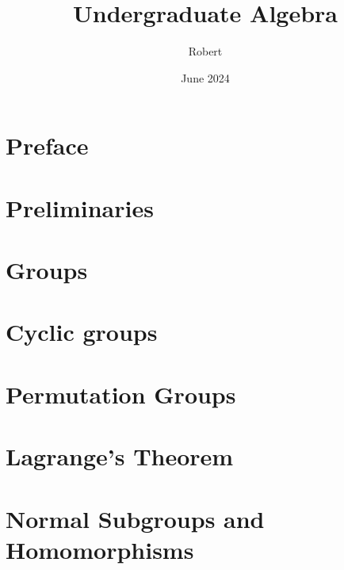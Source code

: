 \documentclass[oneside]{book}
\title{Undergraduate Algebra}
\author{Robert}
\date{June 2024}
\makeatletter
\edef\myauthor{\@author}
\edef\mytitle{\@title}
\makeatother
\begin{document}
\pagestyle{fancy}

\frontmatter
{}

\tableofcontents

\listoftheorems[ignoreall, show={theorem}]
\chapter*{Preface}


\mainmatter
\setcounter{chapter}{-1}
\chapter{Preliminaries}



\chapter{Groups}
\label{chapter:groups}


\chapter{Cyclic groups}
\label{chapter:cyclic-groups}


\chapter{Permutation Groups}
\label{chapter:permutation-groups}


\chapter{Lagrange's Theorem}
\label{chapter:lagrange-theorem}



\chapter{Normal Subgroups and Homomorphisms}
\label{chapter:normal-subgroups-homomorphisms}

\end{document}
